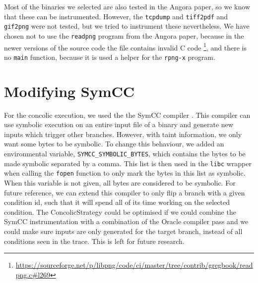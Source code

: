 Most of the binaries we selected are also tested in the Angora paper, so we know that these can be instrumented. However, the \texttt{tcpdump} and \texttt{tiff2pdf} and \texttt{gif2png} were not tested, but we tried to instrument these nevertheless.
We have chosen not to use the \texttt{readpng} program from the Angora paper, because in the newer versions of the source code the file contains invalid C code \footnote{\url{https://sourceforge.net/p/libpng/code/ci/master/tree/contrib/gregbook/readpng.c\#l269}}, and there is no \texttt{main} function, because it is used a helper for the \texttt{rpng-x} program. 


\section{Modifying SymCC}
For the concolic execution, we used the the SymCC compiler \cite{poeplau2020symbolic}. This compiler can use symbolic execution on an entire input file of a binary and generate new inputs which trigger other branches. However, with taint information, we only want some bytes to be symbolic. To change this behaviour, we added an environmental variable, \texttt{SYMCC\_SYMBOLIC\_BYTES}, which contains the bytes to be made symbolic separated by a comma. This list is then used in the \texttt{libc} wrapper when calling the \texttt{fopen} function to only mark the bytes in this list as symbolic. When this variable is not given, all bytes are considered to be symbolic. For future reference, we can extend this compiler to only flip a branch with a given condition id, such that it will spend all of its time working on the selected condition.
The ConcolicStrategy could be optimised if we could combine the SymCC instrumentation with a combination of the Oracle compiler pass and we could make sure inputs are only generated for the target branch, instead of all conditions seen in the trace. This is left for future research.


